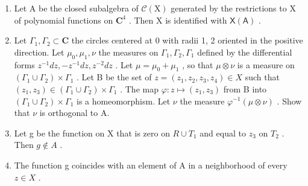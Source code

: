 \begin{enumerate}
\def\labelenumi{\alph{enumi})}
\setcounter{enumi}{1}
\item
  Let A be the closed subalgebra of \(\mathcal{C}(\mathrm{X})\) generated by the restrictions to X of polynomial functions on \(\mathbf{C}^4\) . Then X is identified with \(\mathsf{X}(\mathsf{A})\) .
\item
  Let \(\Gamma_1, \Gamma_2 \subset \mathbf{C}\) the circles centered at 0 with radii 1, 2 oriented in the positive direction. Let \(\mu_0, \mu_1, \nu\) the measures on \(\Gamma_1, \Gamma_2, \Gamma_1\) defined by the differential forms \(z^{-1} dz, -z^{-1} dz, z^{-2} dz\) . Let \(\mu = \mu_0 + \mu_1\) , so that \(\mu \otimes \nu\) is a measure on \((\Gamma_1 \cup \Gamma_2) \times \Gamma_1\) . Let B be the set of \(z = (z_1, z_2, z_3, z_4) \in X\) such that \((z_1, z_3) \in (\Gamma_1 \cup \Gamma_2) \times \Gamma_1\) . The map \(\varphi: z \mapsto (z_1, z_3)\) from B into \((\Gamma_{1} \cup \Gamma_{2}) \times \Gamma_{1}\) is a homeomorphism. Let \(\nu\) the measure \(\varphi^{-1}(\mu \otimes \nu)\) . Show that \(\nu\) is orthogonal to A.
\item
  Let g be the function on X that is zero on \(R \cup T_{1}\) and equal to \(z_{3}\) on \(T_{2}\) . Then \(g \notin A\) .
\item
  The function g coincides with an element of A in a neighborhood of every \(z \in X\) .
\end{enumerate}

